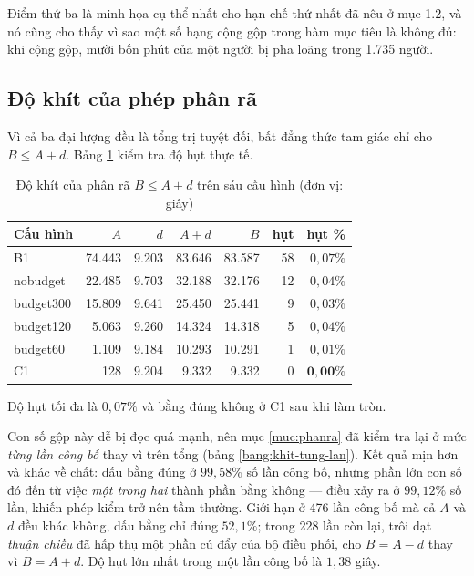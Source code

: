 Điểm thứ ba là minh họa cụ thể nhất cho hạn chế thứ nhất đã nêu ở mục 1.2, và nó cũng cho thấy
vì sao một số hạng cộng gộp trong hàm mục tiêu là không đủ: khi cộng gộp, mười bốn phút của một
người bị pha loãng trong 1.735 người.

\subsection{Độ khít của phép phân rã}

Vì cả ba đại lượng đều là tổng trị tuyệt đối, bất đẳng thức tam giác chỉ cho $B \le A + d$.
Bảng \ref{bang:cong-khit} kiểm tra độ hụt thực tế.

\begin{table}[htbp]
\centering
\caption{Độ khít của phân rã $B \le A + d$ trên sáu cấu hình (đơn vị: giây)}
\label{bang:cong-khit}
\small
\begin{tabular}{@{}lrrrrrr@{}}
\toprule
\textbf{Cấu hình} & $A$ & $d$ & $A+d$ & $B$ & \textbf{hụt} & \textbf{hụt \%}\\
\midrule
B1 & 74.443 & 9.203 & 83.646 & 83.587 & 58 & $0{,}07\%$\\
nobudget & 22.485 & 9.703 & 32.188 & 32.176 & 12 & $0{,}04\%$\\
budget300 & 15.809 & 9.641 & 25.450 & 25.441 & 9 & $0{,}03\%$\\
budget120 & 5.063 & 9.260 & 14.324 & 14.318 & 5 & $0{,}04\%$\\
budget60 & 1.109 & 9.184 & 10.293 & 10.291 & 1 & $0{,}01\%$\\
C1 & 128 & 9.204 & 9.332 & 9.332 & 0 & $\mathbf{0{,}00\%}$\\
\bottomrule
\end{tabular}
\end{table}

Độ hụt tối đa là $0{,}07\%$ và bằng đúng không ở C1 sau khi làm tròn.

Con số gộp này dễ bị đọc quá mạnh, nên mục \ref{muc:phanra} đã kiểm tra lại ở mức \emph{từng lần
công bố} thay vì trên tổng (bảng \ref{bang:khit-tung-lan}). Kết quả mịn hơn và khác về chất: dấu
bằng đúng ở $99{,}58\%$ số lần công bố, nhưng phần lớn con số đó đến từ việc \emph{một trong hai}
thành phần bằng không --- điều xảy ra ở $99{,}12\%$ số lần, khiến phép kiểm trở nên tầm thường.
Giới hạn ở 476 lần công bố mà cả $A$ và $d$ đều khác không, dấu bằng chỉ đúng $52{,}1\%$; trong
228 lần còn lại, trôi dạt \emph{thuận chiều} đã hấp thụ một phần cú đẩy của bộ điều phối, cho
$B = A - d$ thay vì $B = A + d$. Độ hụt lớn nhất trong một lần công bố là $1{,}38$ giây.

